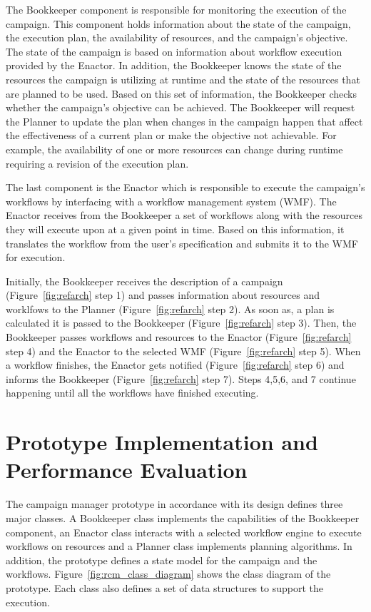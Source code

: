 The Bookkeeper component is responsible for monitoring the execution of the 
campaign. This component holds information about the state of the campaign, 
the execution plan, the availability of resources, and the campaign's 
objective. The state of the campaign is based on information about workflow 
execution provided by the Enactor. In addition, the Bookkeeper knows the state 
of the resources the campaign is utilizing at runtime and the state of the 
resources that are planned to be used. Based on this set of information, the 
Bookkeeper checks whether the campaign's objective can be achieved. The 
Bookkeeper will request the Planner to update the plan when changes in the 
campaign happen that affect the effectiveness of a current plan or make the 
objective not achievable. For example, the availability of one or more 
resources can change during runtime requiring a revision of the execution plan.

The last component is the Enactor which is responsible to execute the 
campaign's workflows by interfacing with a workflow management system (WMF).
The Enactor receives from the Bookkeeper a set of workflows along with the 
resources they will execute upon at a given point in time. Based on this 
information, it translates the workflow from the user's specification and 
submits it to the WMF for execution.

Initially, the Bookkeeper receives the description of a campaign 
(Figure~\ref{fig:refarch} step 1) and passes information about resources and 
worklfows to the Planner (Figure~\ref{fig:refarch} step 2). As soon as, a plan 
is calculated it is passed to the Bookkeeper (Figure~\ref{fig:refarch} step 3).
Then, the Bookkeeper passes workflows and resources to the Enactor 
(Figure~\ref{fig:refarch} step 4) and the Enactor to the selected WMF 
(Figure~\ref{fig:refarch} step 5). When a workflow finishes, the Enactor gets 
notified (Figure~\ref{fig:refarch} step 6) and informs the Bookkeeper 
(Figure~\ref{fig:refarch} step 7). Steps 4,5,6, and 7 continue happening until 
all the workflows have finished executing.

\section{Prototype Implementation and Performance Evaluation}
\label{sec:cm_impl}

The campaign manager prototype in accordance with its design defines three 
major classes. A Bookkeeper class implements the capabilities of the 
Bookkeeper component, an Enactor class interacts with a selected workflow 
engine to execute workflows on resources and a Planner class implements 
planning algorithms. In addition, the prototype defines a state model for the 
campaign and the workflows. Figure~\ref{fig:rcm_class_diagram} shows the class 
diagram of the prototype. Each class also defines a set of data structures to 
support the execution.

